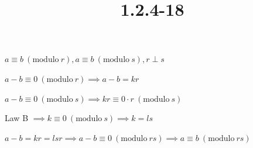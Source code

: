 \documentclass{article}
\title{1.2.4-18}
\begin{document}
\maketitle

\( a \equiv b\ (\mathrm{modulo}\ r), a \equiv b\ (\mathrm{modulo}\ s), r \perp s \)

\( a - b \equiv 0\ (\mathrm{modulo}\ r) \implies a - b = kr \)

\( a - b \equiv 0\ (\mathrm{modulo}\ s) \implies kr \equiv 0\cdot r \ (\mathrm{modulo}\ s) \)

Law B \( \implies k \equiv 0\ (\mathrm{modulo}\ s) \implies k = ls \)

\( a - b = kr = lsr \implies a - b \equiv 0\ (\mathrm{modulo}\ rs) \implies a \equiv b\ (\mathrm{modulo}\ rs) \)
\end{document}
